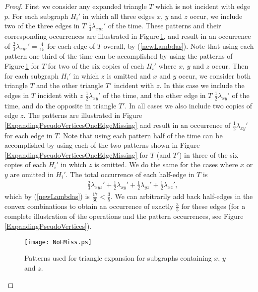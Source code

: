 \documentclass[oneeqnum,final]{siamltex1213}
\begin{document}
\begin{proof}
First we consider any expanded triangle $T$ which is not incident with edge $p$. For each subgraph $H_{i}'$ in which all three edges $x$, $y$ and $z$ occur, we include two of the three edges in $T$ $\frac{1}{3}\lambda_{xyz}'$ of the time. These patterns and their corresponding occurrences are illustrated in Figure\,\ref{ExpandingPseudoVerticesNoEdgeMissing}, and result in an occurrence of $\frac{2}{3}\lambda_{xyz}'=\frac{4}{15}$ for each edge of $T$ overall, by (\ref{newLambdas}). Note that using each pattern one third of the time can be accomplished by using the patterns of Figure\,\ref{ExpandingPseudoVerticesNoEdgeMissing} for $T$ for two of the six copies of each $H_{i}'$ where $x$, $y$ and $z$ occur. Then for each subgraph $H_{i}'$ in which $z$ is omitted and $x$ and $y$ occur, we consider both triangle $T$ and  the other triangle $T'$ incident with $z$. In this case we include the edges in $T$ incident with $z$ $\frac{1}{2}\lambda_{xy}'$ of the time, and the other edge in $T$ $\frac{1}{2}\lambda_{xy}'$ of the time, and do the opposite in triangle $T'$. In all cases we also include two copies of edge $z$. The patterns are illustrated in Figure\,\ref{ExpandingPseudoVerticesOneEdgeMissing} and result in an occurrence of $\frac{1}{2}\lambda_{xy}'$ for each edge in $T$. Note that using each pattern half of the time can be accomplished by using each of the two patterns shown in Figure\,\ref{ExpandingPseudoVerticesOneEdgeMissing} for $T$ (and $T'$) in three of the six copies of each $H_{i}'$ in which $z$ is omitted. We do the same for the cases where $x$ or $y$ are omitted in $H_{i}'$. The total occurrence of each half-edge in $T$ is 
\begin{equation*}
\begin{split}
&\frac{2}{3}\lambda_{xyz}' + \frac{1}{2}\lambda_{xy}' + \frac{1}{2}\lambda_{yz}' + \frac{1}{2}\lambda_{xz}' \text{,}
\end{split}
\end{equation*}
which by (\ref{newLambdas}) is $\frac{17}{30} < \frac{3}{5}$. We can arbitrarily add back half-edges in the convex combinations to obtain an occurrence of exactly $\frac{3}{5}$ for these edges (for a complete illustration of the operations and the pattern occurrences, see Figure\,\ref{ExpandingPseudoVertices}).

\begin{figure}
\begin{center}
\texttt{[image: NoEMiss.ps]}
\end{center}
\caption{Patterns used for triangle expansion for subgraphs containing $x$, $y$ and $z$.}
\label{ExpandingPseudoVerticesNoEdgeMissing}
\end{figure}


\end{proof}
\end{document}
